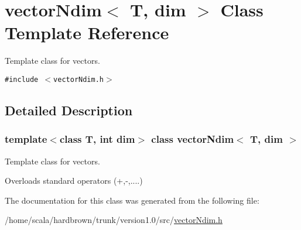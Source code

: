 \hypertarget{classvectorNdim}{
\section{vectorNdim$<$ T, dim $>$ Class Template Reference}
\label{classvectorNdim}
}
Template class for vectors.  


{\tt \#include $<$vectorNdim.h$>$}



\subsection{Detailed Description}
\subsubsection*{template$<$class T, int dim$>$ class vectorNdim$<$ T, dim $>$}

Template class for vectors. 

Overloads standard operators (+,-,....) 

The documentation for this class was generated from the following file:\begin{CompactItemize}
\item 
/home/scala/hardbrown/trunk/version1.0/src/\hyperlink{vectorNdim_8h}{vectorNdim.h}\end{CompactItemize}
